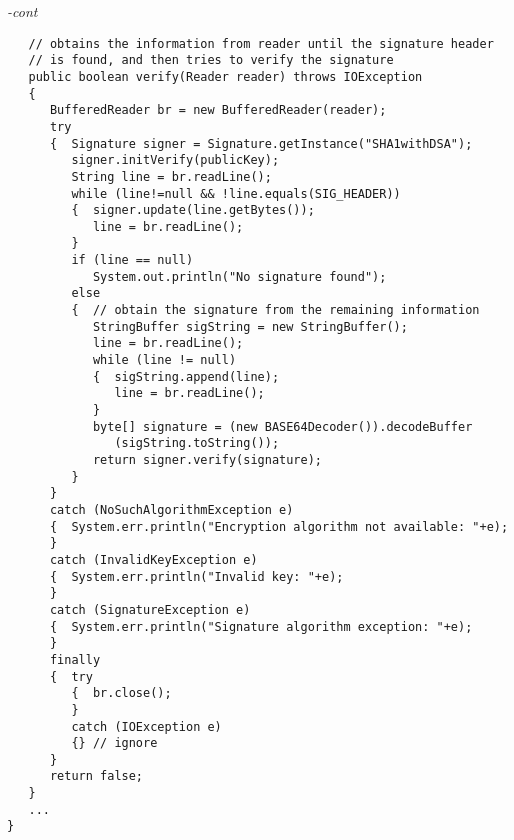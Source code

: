 \begin{figure*}\begin{program}\emph{-cont}\begin{verbatim}
   // obtains the information from reader until the signature header
   // is found, and then tries to verify the signature
   public boolean verify(Reader reader) throws IOException
   {
      BufferedReader br = new BufferedReader(reader);
      try
      {  Signature signer = Signature.getInstance("SHA1withDSA");
         signer.initVerify(publicKey);
         String line = br.readLine();
         while (line!=null && !line.equals(SIG_HEADER))
         {  signer.update(line.getBytes());
            line = br.readLine();
         }
         if (line == null)
            System.out.println("No signature found");
         else
         {  // obtain the signature from the remaining information
            StringBuffer sigString = new StringBuffer();
            line = br.readLine();
            while (line != null)
            {  sigString.append(line);
               line = br.readLine();
            }
            byte[] signature = (new BASE64Decoder()).decodeBuffer
               (sigString.toString());
            return signer.verify(signature);
         }
      }
      catch (NoSuchAlgorithmException e)
      {  System.err.println("Encryption algorithm not available: "+e);
      }
      catch (InvalidKeyException e)
      {  System.err.println("Invalid key: "+e);
      }
      catch (SignatureException e)
      {  System.err.println("Signature algorithm exception: "+e);
      }
      finally
      {  try
         {  br.close();
         }
         catch (IOException e)
         {} // ignore
      }
      return false;
   }
   ...
}
\end{verbatim}\end{program}\end{figure*}

